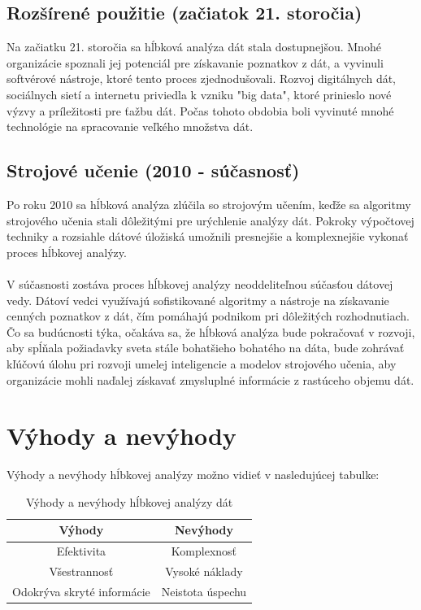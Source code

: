 \documentclass[10pt,twoside,slovak,a4paper]{article}
\begin{document}
\subsection{Rozšírené použitie (začiatok 21. storočia)} 
Na začiatku 21. storočia sa hĺbková analýza dát stala dostupnejšou. Mnohé organizácie spoznali jej potenciál pre získavanie poznatkov z dát, a vyvinuli softvérové nástroje, ktoré tento proces zjednodušovali. Rozvoj digitálnych dát, sociálnych sietí a internetu priviedla k vzniku "big data", ktoré prinieslo nové výzvy a príležitosti pre ťažbu dát. Počas tohoto obdobia boli vyvinuté mnohé technológie na spracovanie veľkého množstva dát.
\subsection{Strojové učenie (2010 - súčasnosť)}
Po roku 2010 sa hĺbková analýza zlúčila so strojovým učením, keďže sa algoritmy strojového učenia stali dôležitými pre urýchlenie analýzy dát. Pokroky výpočtovej techniky a rozsiahle dátové úložiská umožnili presnejšie a komplexnejšie vykonať proces hĺbkovej analýzy.
\\
\\
V súčasnosti zostáva proces hĺbkovej analýzy neoddeliteľnou súčasťou dátovej vedy. Dátoví vedci využívajú sofistikované algoritmy a nástroje na získavanie cenných poznatkov z dát, čím pomáhajú podnikom pri dôležitých rozhodnutiach. Čo sa budúcnosti týka, očakáva sa, že hĺbková analýza bude pokračovať v rozvoji, aby spĺňala požiadavky sveta stále bohatšieho bohatého na dáta, bude zohrávať kľúčovú úlohu pri rozvoji umelej inteligencie a modelov strojového učenia, aby organizácie mohli naďalej získavať zmysluplné informácie z rastúceho objemu dát.\cite{Majid:Evolution}

\section{Výhody a nevýhody}
Výhody a nevýhody hĺbkovej analýzy možno vidieť v nasledujúcej tabulke:

\begin{table}[h!]
    \centering
    \begin{tabular}{|c||c|}
        \hline
         Výhody &  Nevýhody\\
         \hline\hline
         Efektivita & Komplexnosť\\
         \hline
         Všestrannosť & Vysoké náklady\\
         \hline
         Odokrýva skryté informácie & Neistota úspechu\\
         \hline
    \end{tabular}
    \caption{Výhody a nevýhody hĺbkovej analýzy dát\cite{AlexandraTwin}}
    \label{tab:my_label}
\end{table}
\end{document}
